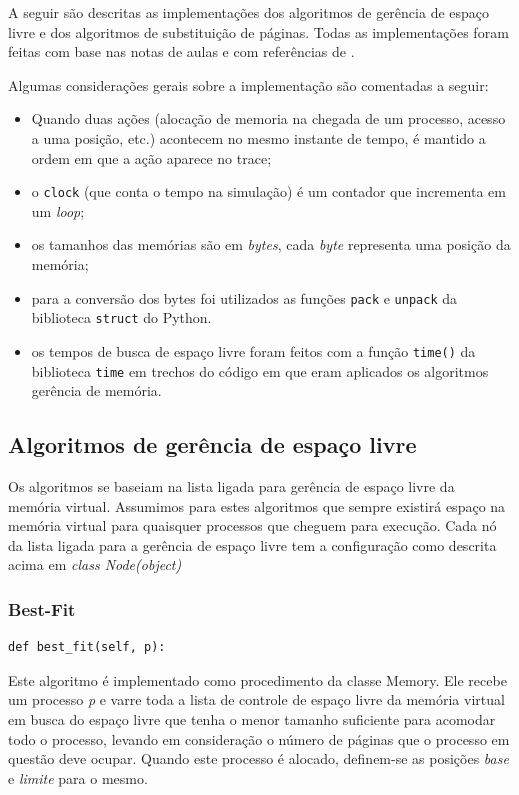 \documentclass[12pt,a4paper]{article}
\begin{document}
A seguir são descritas as implementações dos algoritmos de gerência de espaço livre e dos algoritmos de substituição de páginas. Todas as implementações foram feitas com base nas notas de aulas e com referências de \cite{tanenbaum2009m}.

Algumas considerações gerais sobre a implementação são comentadas a seguir:

\begin{itemize}
\item Quando duas ações (alocação de memoria na chegada de um processo, acesso a uma posição, etc.) acontecem no mesmo instante de tempo, é mantido a ordem em que a ação aparece no trace;
\item o \texttt{clock} (que conta o tempo na simulação) é um contador que incrementa em um \textit{loop};
\item os tamanhos das memórias são em \textit{bytes}, cada \textit{byte} representa uma posição da memória;
\item para a conversão dos bytes foi utilizados as funções \texttt{pack} e \texttt{unpack} da biblioteca \texttt{struct} do Python.

\item os tempos de busca de espaço livre foram feitos com a função \texttt{time()} da biblioteca \texttt{time} em trechos do código em que eram aplicados os algoritmos gerência de memória.

\end{itemize}

\subsection{Algoritmos de gerência de espaço livre}

Os algoritmos se baseiam na lista ligada para gerência de espaço livre da memória virtual.
Assumimos para estes algoritmos que sempre existirá espaço na memória virtual para quaisquer processos que cheguem para execução.
Cada nó da lista ligada para a gerência de espaço livre tem a configuração como descrita acima  em \textit{class Node(object)}

\subsubsection{Best-Fit}
\begin{lstlisting}
def best_fit(self, p):
\end{lstlisting}
Este algoritmo é implementado como procedimento da classe Memory. Ele recebe um processo \textit{p} e varre toda a lista de controle de espaço livre da memória virtual em busca do espaço livre que tenha o menor tamanho suficiente para acomodar todo o processo, levando em consideração o número de páginas que o processo em questão deve ocupar.
Quando este processo é alocado, definem-se as posições \textit{base} e \textit{limite} para o mesmo.
\end{document}
